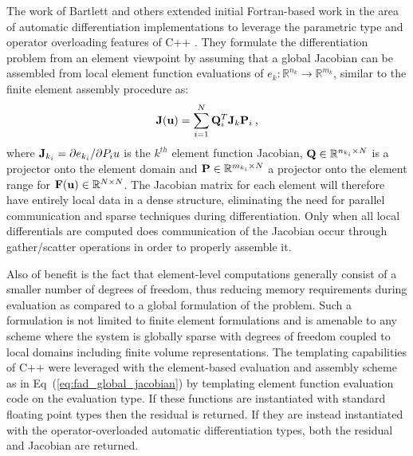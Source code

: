 The work of Bartlett and others \cite{bartlett_automatic_2006}
extended initial Fortran-based work in the area of automatic
differentiation implementations to leverage the parametric type and
operator overloading features of C++ \cite{stroustrup_c++_1997}. They
formulate the differentiation problem from an element viewpoint by
assuming that a global Jacobian can be assembled from local element
function evaluations of $e_k : \mathbb{R}^{n_k} \rightarrow
\mathbb{R}^{m_k}$, similar to the finite element assembly procedure
as:
\begin{equation}
  \mathbf{J}(\mathbf{u}) = \sum_{i=1}^N \mathbf{Q}^T_i \mathbf{J}_k \mathbf{P}_i\:,
  \label{eq:fad_global_jacobian}
\end{equation}
where $\mathbf{J}_{k_i} = \partial e_{k_i} / \partial P_i u$ is the
$k^{th}$ element function Jacobian, $\mathbf{Q} \in \mathbb{R}^{n_{k_i}
  \times N}$ is a projector onto the element domain and $\mathbf{P} \in
\mathbb{R}^{m_{k_i} \times N}$ a projector onto the element range for
$\mathbf{F}(\mathbf{u}) \in \mathbb{R}^{N \times N}$. The Jacobian matrix for
each element will therefore have entirely local data in a dense
structure, eliminating the need for parallel communication and sparse
techniques during differentiation. Only when all local differentials
are computed does communication of the Jacobian occur through
gather/scatter operations in order to properly assemble it. 

Also of benefit is the fact that element-level computations generally
consist of a smaller number of degrees of freedom, thus reducing
memory requirements during evaluation as compared to a global
formulation of the problem. Such a formulation is not limited to
finite element formulations and is amenable to any scheme where the
system is globally sparse with degrees of freedom coupled to local
domains including finite volume representations. The templating
capabilities of C++ were leveraged with the element-based evaluation
and assembly scheme as in Eq~(\ref{eq:fad_global_jacobian}) by
templating element function evaluation code on the evaluation type. If
these functions are instantiated with standard floating point types
then the residual is returned. If they are instead instantiated with
the operator-overloaded automatic differentiation types, both the
residual and Jacobian are returned.

